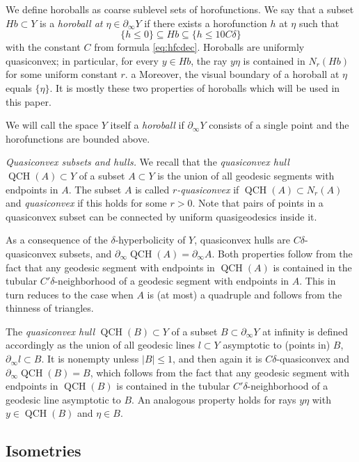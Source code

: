 \documentclass[12pt]{article}
\theoremstyle{boldplain}
\theoremstyle{bolddefinition}
\numberwithin{equation}{section}
\def\de{\delta}
\def\QCH{\operatorname{QCH}}
\def\geo{\partial_{\infty}}
\begin{document}
We define horoballs as coarse sublevel sets of horofunctions. 
We say that a subset $Hb\subset Y$ is a {\em horoball at $\eta\in\geo Y$}
if there exists a horofunction $h$ at $\eta$ such that 
$$ \{h\leq 0\} \subseteq Hb \subseteq \{h\leq 10C\de\} $$
with the constant $C$ from formula \eqref{eq:hfcdec}.
Horoballs are uniformly quasiconvex; in particular, for every $y\in Hb$, the ray $y\eta$ is contained in $N_r(Hb)$ for some uniform constant $r$.  a
Moreover, the visual boundary of a horoball at $\eta$ equals $\{\eta\}$. 
It is mostly these two properties of horoballs which will be used in this paper. 

We will call the space $Y$ itself a {\em horoball} if $\geo Y$ consists of a single point 
and the horofunctions are bounded above.

\medskip 
{\em Quasiconvex subsets and hulls.}
We recall that the {\em quasiconvex hull} $\QCH(A)\subset Y$ of a subset $A\subset Y$ 
is the union of all geodesic segments with endpoints in $A$.
The subset $A$ is called {\em $r$-quasiconvex} if $\QCH(A)\subset N_r(A)$ 
and {\em quasiconvex} if this holds for some $r>0$.
Note that pairs of points in a quasiconvex subset can be connected by uniform quasigeodesics inside it.

As a consequence of the $\delta$-hyperbolicity of $Y$, quasiconvex hulls are $C\de$-quasiconvex subsets,
and $\geo\QCH(A)=\geo A$. 
Both properties follow from the fact that any geodesic segment with endpoints in $\QCH(A)$
is contained in the tubular $C'\de$-neighborhood of a geodesic segment with endpoints in $A$.
This in turn reduces to the case when $A$ is (at most) a quadruple and follows from the thinness of triangles. 

The {\em quasiconvex hull} $\QCH(B)\subset Y$ of a subset $B\subset \geo Y$ at infinity 
is defined accordingly as the union of all geodesic lines $l\subset Y$ asymptotic to (points in) $B$, $\geo l\subset B$. 
It is nonempty unless $|B|\leq 1$, 
and then again it is $C\de$-quasiconvex and $\geo \QCH(B)=B$,
which follows from the fact that any geodesic segment with endpoints in $\QCH(B)$
is contained in the tubular $C'\de$-neighborhood of a geodesic line asymptotic to $B$.
An analogous property holds for rays $y\eta$ with $y\in\QCH(B)$ and $\eta\in B$.




\subsection{Isometries}
\end{document}
